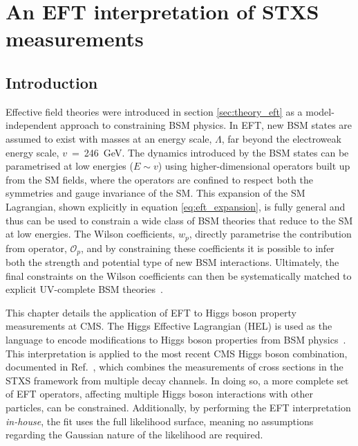 \chapter{An EFT interpretation of STXS measurements}
\label{chap:eft}

\section{Introduction}

Effective field theories were introduced in section \ref{sec:theory_eft} as a model-independent approach to constraining BSM physics. In EFT, new BSM states are assumed to exist with masses at an energy scale, $\Lambda$, far beyond the electroweak energy scale, $v$~=~246~GeV. The dynamics introduced by the BSM states can be parametrised at low energies ($E \sim v$) using higher-dimensional operators built up from the SM fields, where the operators are confined to respect both the symmetries and gauge invariance of the SM. This expansion of the SM Lagrangian, shown explicitly in equation \ref{eq:eft_expansion}, is fully general and thus can be used to constrain a wide class of BSM theories that reduce to the SM at low energies. The Wilson coefficients, $w_p$, directly parametrise the contribution from operator, $\mathcal{O}_p$, and by constraining these coefficients it is possible to infer both the strength and potential type of new BSM interactions. Ultimately, the final constraints on the Wilson coefficients can then be systematically matched to explicit UV-complete BSM theories~\cite{}.

This chapter details the application of EFT to Higgs boson property measurements at CMS. The Higgs Effective Lagrangian (HEL) is used as the language to encode modifications to Higgs boson properties from BSM physics~\cite{Contino:2013kra,Alloul:2013naa}. This interpretation is applied to the most recent CMS Higgs boson combination, documented in Ref.~\cite{CMS-PAS-HIG-19-005}, which combines the measurements of cross sections in the STXS framework from multiple decay channels. In doing so, a more complete set of EFT operators, affecting multiple Higgs boson interactions with other particles, can be constrained. Additionally, by performing the EFT interpretation \textit{in-house}, the fit uses the full likelihood surface, meaning no assumptions regarding the Gaussian nature of the likelihood are required.

